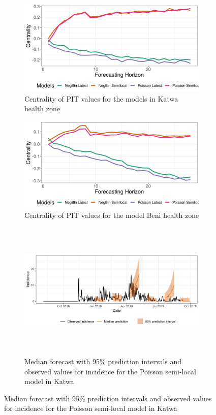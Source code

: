 \documentclass[12pt]{article}
\begin{document}
\begin{figure}[h!]
\begin{subfigure}{0.5\textwidth}
  \centering
  \includegraphics[width=\linewidth, ]{../output/Katwa_centrality.png}  
  \caption{Centrality of PIT values for the models in Katwa health zone }
  \label{fig:beni_katwa_1}
\end{subfigure}
\begin{subfigure}{0.5\textwidth}
  \centering
  \includegraphics[width=\linewidth]{../output/Beni_centrality.png}  
  \caption{Centrality of PIT values for the model Beni health zone}
  \label{fig:beni_katwa_2}
\end{subfigure}

\begin{subfigure}{\textwidth}
  \centering
  \includegraphics[width=0.9\linewidth, height=6.6cm]{../output/Katwa_predictions.png}  
  \caption{ Median forecast with 95\% prediction intervals and observed values for incidence for the Poisson semi-local model in Katwa}
  \label{fig:beni_katwa_3}
\end{subfigure}


\end{figure}
\end{document}
